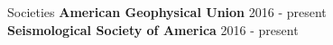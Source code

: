 \begin{rSection}{Societies}
	\textbf{American Geophysical Union} \hfill 2016 - present\\
	\textbf{Seismological Society of America} \hfill 2016 - present
\end{rSection}
